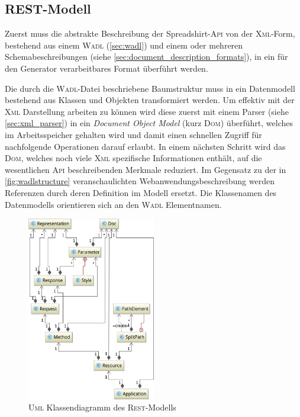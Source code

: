\subsection{REST-Modell}
\label{sec:rest_model}

Zuerst muss die abstrakte Beschreibung der Spreadshirt-\textsc{Api} von der \textsc{Xml}-Form, bestehend aus einem \textsc{Wadl} (\cref{sec:wadl}) und einem oder mehreren Schemabeschreibungen (siehe \cref{sec:document_description_formats}), in ein für den Generator verarbeitbares Format überführt werden.

Die durch die \textsc{Wadl}-Datei beschriebene Baumstruktur muss in ein Datenmodell bestehend aus Klassen und Objekten transformiert werden.
Um effektiv mit der \textsc{Xml} Darstellung arbeiten zu können wird diese zuerst mit einem Parser (siehe \cref{sec:xml_parser}) in ein \emph{Document Object Model} (kurz \textsc{Dom}) überführt, welches im Arbeitsspeicher gehalten wird und damit einen schnellen Zugriff für nachfolgende Operationen darauf erlaubt. In einem nächsten Schritt wird das \textsc{Dom}, welches noch viele \textsc{Xml} spezifische Informationen enthält, auf die wesentlichen \textsc{Api} beschreibenden Merkmale reduziert. Im Gegensatz zu der in \cref{fig:wadlstructure} veranschaulichten Webanwendungsbeschreibung werden Referenzen durch deren Definition im Modell ersetzt. Die Klassenamen des Datenmodells orientieren sich an den \textsc{Wadl} Elementnamen.

\begin{figure}[tb]
    \centering
    \includegraphics[width=0.5\textwidth]{resources/restmodel}
    \caption{\textsc{Uml} Klassendiagramm des \textsc{Rest}-Modells}
    \label{fig:restmodel}
\end{figure}

